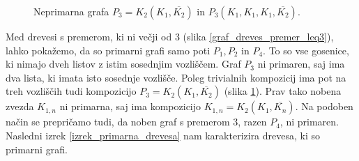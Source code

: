 \documentclass[a4paper, 12pt]{book}
\begin{document}
\begin{figure}[h]
    \begin{center}        
        \qquad
    \end{center}
    \caption{Neprimarna grafa $P_3 = K_2(K_1, \overline{K_2})$ in $P_3(K_1, K_1, K_1, \overline{K_2})$.}
    \label{graf_P3_graf_kompozicije_P3_P1_P1_P1_K2c}
\end{figure}

Med drevesi s premerom, ki ni večji od 3 (slika \ref{graf_dreves_premer_leq3}), lahko pokažemo, da so primarni grafi samo poti $P_1, P_2$ in $P_4$. To so vse gosenice, ki nimajo dveh listov z istim sosednjim vozliščem. Graf $P_3$ ni primaren, saj ima dva lista, ki imata isto sosednje vozlišče. Poleg trivialnih kompozicij ima pot na treh vozliščih tudi kompozicijo $P_3 = K_2(K_1, \overline{K_2})$ (slika \ref{graf_P3_graf_kompozicije_P3_P1_P1_P1_K2c}). Prav tako nobena zvezda $K_{1,n}$ ni primarna, saj ima kompozicijo $K_{1,n} = K_2(K_1, \overline{K_n})$. Na podoben način se prepričamo tudi, da noben graf s premerom $3$, razen $P_4$, ni primaren. Nasledni izrek \ref{izrek_primarna_drevesa} nam karakterizira drevesa, ki so primarni grafi.
\end{document}
